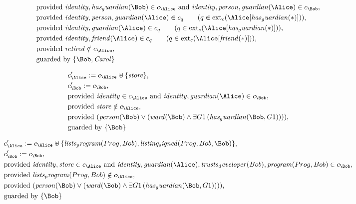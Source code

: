 \begin{align*}
&
\text{provided } 
\mathit{
identity
}
,
\mathit{
has_guardian
}
(
\Bob
)
 \in c_
{
\Alice
}
 \text{ and } 
\mathit{
identity
}
,
\mathit{
person
}
,
\mathit{
guardian
}
(
\Alice
)
 \in c_
{
\Bob
}
,\\
&
\text{provided } 
\mathit{
identity
}
,
\mathit{
person
}
,
\mathit{
guardian
}
(
\Alice
)
 \in c_
q
 \qquad (
q \in 
\mathrm{ext}_c(
\Alice
[
\mathit{
has_guardian
}
(
\ast
)
]
)
)
,\\
&
\text{provided } 
\mathit{
identity
}
,
\mathit{
guardian
}
(
\Alice
)
 \in c_
q
 \qquad (
q \in 
\mathrm{ext}_c(
\Alice
[
\mathit{
has_guardian
}
(
\ast
)
]
)
)
,\\
&
\text{provided } 
\mathit{
identity
}
,
\mathit{
friend
}
(
\Alice
)
 \in c_
q
 \qquad (
q \in 
\mathrm{ext}_c(
\Alice
[
\mathit{
friend
}
(
\ast
)
]
)
)
,\\
&
\text{provided } 
\mathit{
retired
}
 \notin c_
{
\Alice
}
,\\
&
\text{guarded by } \{
\Bob
,
\mathit{Carol}
\}
\end{align*}

\begin{align*}
&
c'_
{
\Alice
}
 := 
c_
{
\Alice
}
 \uplus 
\{
\mathit{
store
}
\}
,\\
&
c'_
{
\Bob
}
 := 
c_
{
\Bob
}
,\\
&
\text{provided } 
\mathit{
identity
}
 \in c_
{
\Alice
}
 \text{ and } 
\mathit{
identity
}
,
\mathit{
guardian
}
(
\Alice
)
 \in c_
{
\Bob
}
,\\
&
\text{provided } 
\mathit{
store
}
 \notin c_
{
\Alice
}
,\\
&
\text{provided } 
(
\mathit{
person
}
(
\Bob
)
\lor
(
\mathit{
ward
}
(
\Bob
)
\land
\exists 
G1
\,(
\mathit{
has_guardian
}
(
\Bob
,
G1
)
)
)
)
,\\
&
\text{guarded by } \{
\Bob
\}
\end{align*}

\begin{align*}
&
c'_
{
\Alice
}
 := 
c_
{
\Alice
}
 \uplus 
\{
\mathit{
lists_program
}
(
Prog
,
Bob
)
,
\mathit{
listing_signed
}
(
Prog
,
Bob
,
\Bob
)
\}
,\\
&
c'_
{
\Bob
}
 := 
c_
{
\Bob
}
,\\
&
\text{provided } 
\mathit{
identity
}
,
\mathit{
store
}
 \in c_
{
\Alice
}
 \text{ and } 
\mathit{
identity
}
,
\mathit{
guardian
}
(
\Alice
)
,
\mathit{
trusts_developer
}
(
Bob
)
,
\mathit{
program
}
(
Prog
,
Bob
)
 \in c_
{
\Bob
}
,\\
&
\text{provided } 
\mathit{
lists_program
}
(
Prog
,
Bob
)
 \notin c_
{
\Alice
}
,\\
&
\text{provided } 
(
\mathit{
person
}
(
\Bob
)
\lor
(
\mathit{
ward
}
(
\Bob
)
\land
\exists 
G1
\,(
\mathit{
has_guardian
}
(
\Bob
,
G1
)
)
)
)
,\\
&
\text{guarded by } \{
\Bob
\}
\end{align*}
